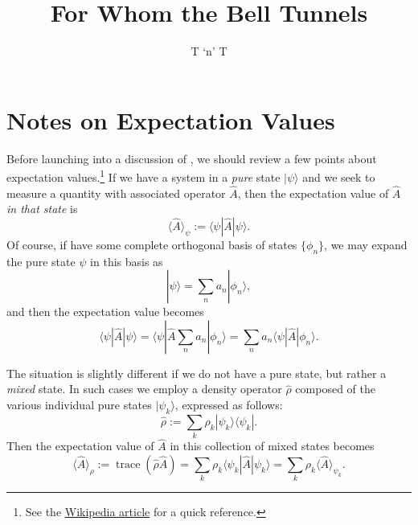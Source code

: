 \documentclass[12pt]{article}
\title{For Whom the Bell Tunnels}
\author{T `n' T}
\begin{document}
\maketitle
\listoftodos

\section{Notes on Expectation Values}

Before launching into a discussion of \cite{Bell1966}, we should review a few points about expectation values.\footnote{See the \href{http://en.wikipedia.org/wiki/Expectation_value_\%28quantum_mechanics\%29}{Wikipedia article} for a quick reference.} If we have a system in a \emph{pure} state $|\psi\rangle$ and we seek to measure a quantity with associated operator $\hat{A}$, then the expectation value of $\hat{A}$ \emph{in that state} is
\begin{displaymath}
  \langle \hat{A} \rangle_{\psi} := \langle \psi | \hat{A} | \psi \rangle.
\end{displaymath}
Of course, if have some complete orthogonal basis of states $\{ \phi_n \}$, we may expand the pure state $\psi$ in this basis as
\begin{displaymath}
  |\psi\rangle = \sum_{n} a_n |\phi_n \rangle,
\end{displaymath}
and then the expectation value becomes
\begin{displaymath}
  \langle \psi | \hat{A} | \psi \rangle
  = \langle \psi | \hat{A} \sum_{n} a_n | \phi_n \rangle
  = \sum_{n} a_n \langle \psi | \hat{A} | \phi_n \rangle.
\end{displaymath}

The situation is slightly different if we do not have a pure state, but rather a \emph{mixed} state. In such cases we employ a density operator $\hat{\rho}$ composed of the various individual pure states $| \psi_k \rangle$, expressed as follows:
\begin{displaymath}
  \hat{\rho} := \sum_k \rho_k | \psi_k \rangle \langle \psi_k |.
\end{displaymath}
Then the expectation value of $\hat{A}$ in this collection of mixed states becomes
\begin{displaymath}
  \langle \hat{A} \rangle_{\rho} := \operatorname{trace} (\hat{\rho} \hat{A})
  = \sum_k \rho_k \langle \psi_k | \hat{A} | \psi_k \rangle
  = \sum_k \rho_k \langle \hat{A} \rangle_{\psi_k}.
\end{displaymath}
\end{document}
